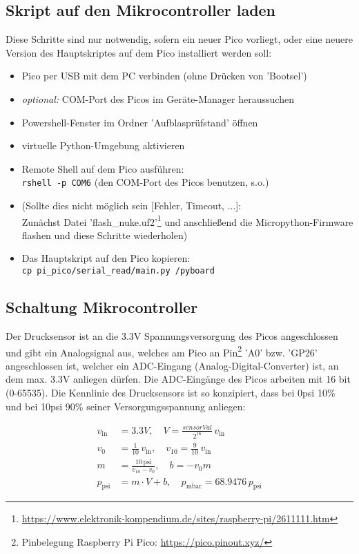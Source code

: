 \documentclass[german, 11pt]{scrartcl}
\begin{document}
\subsection{Skript auf den Mikrocontroller laden}
Diese Schritte sind nur notwendig, sofern ein neuer Pico vorliegt, oder eine neuere Version des Hauptskriptes auf dem Pico installiert werden soll:
\begin{itemize}
    \item Pico per USB mit dem PC verbinden (ohne Drücken von 'Bootsel')
     \item \textit{optional:} COM-Port des Picos im Geräte-Manager heraussuchen
    \item Powershell-Fenster im Ordner 'Aufblasprüfstand' öffnen
    \item virtuelle Python-Umgebung aktivieren
    \item Remote Shell auf dem Pico ausführen:\\
    \texttt{rshell -p COM6} \hfill (den COM-Port des Picos benutzen, s.o.)
    \item (Sollte dies nicht möglich sein [Fehler, Timeout, ...]:\\
    Zunächst Datei 'flash\_nuke.uf2'\footnote[2]{\url{https://www.elektronik-kompendium.de/sites/raspberry-pi/2611111.htm}} und anschließend die Micropython-Firmware flashen und diese Schritte wiederholen)
    \item Das Hauptskript auf den Pico kopieren:\\
    \texttt{cp pi\_pico/serial\_read/main.py /pyboard}
\end{itemize}

\subsection{Schaltung Mikrocontroller}
Der Drucksensor ist an die 3.3V Spannungsversorgung des Picos angeschlossen und gibt ein Analogsignal aus,
welches am Pico an Pin\footnote[3]{Pinbelegung Raspberry Pi Pico: \url{https://pico.pinout.xyz/}} 'A0' bzw. 'GP26' angeschlossen ist,
welcher ein ADC-Eingang (Analog-Digital-Converter) ist, an dem max. 3.3V anliegen dürfen. Die ADC-Eingänge des Picos arbeiten mit 16 bit (0-65535).
Die Kennlinie des Drucksensors ist so konzipiert, dass bei 0psi 10\% und bei 10psi 90\% seiner Versorgungsspannung anliegen:

\begin{equation*}
    \begin{aligned}
        v_{\text{in}} &= 3.3V, \quad V = \frac{sensorVal}{2^{16}}\,v_{\text{in}} \\
        v_0 &= \frac{1}{10}\,v_{\text{in}}, \quad v_{10} = \frac{9}{10}\,v_{\text{in}} \\
        m &= \frac{10\,\text{psi}}{v_{10}-v_0}, \quad b = -v_0 m \\
        p_{\text{psi}} &= m \cdot V + b, \quad p_{\text{mbar}} = 68.9476\,p_{\text{psi}}
    \end{aligned}
\end{equation*}
\end{document}
